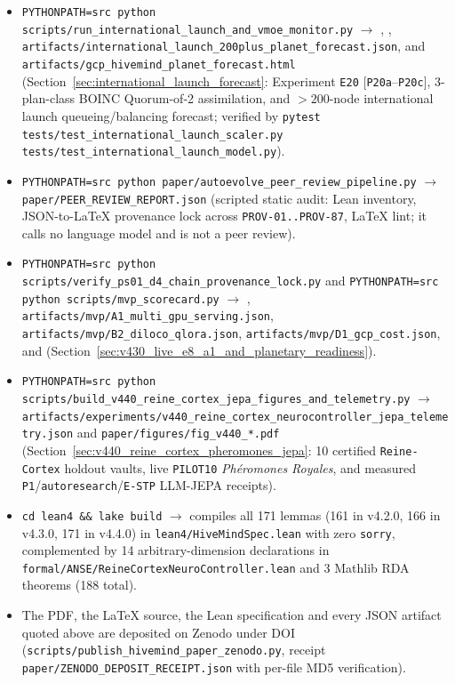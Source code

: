 \documentclass[11pt,a4paper]{article}
\begin{document}
\begin{itemize}[leftmargin=1.8em]
    \item \texttt{PYTHONPATH=src python scripts/run\_international\_launch\_and\_vmoe\_monitor.py} $\to$ , , \texttt{artifacts/international\_launch\_200plus\_planet\_forecast.json}, and \texttt{artifacts/gcp\_hivemind\_planet\_forecast.html} (Section~\ref{sec:international_launch_forecast}: Experiment \texttt{E20} [\texttt{P20a}--\texttt{P20c}], 3-plan-class BOINC Quorum-of-2 assimilation, and $>200$-node international launch queueing/balancing forecast; verified by \texttt{pytest tests/test\_international\_launch\_scaler.py tests/test\_international\_launch\_model.py}).
    \item \texttt{PYTHONPATH=src python paper/autoevolve\_peer\_review\_pipeline.py} $\to$ \texttt{paper/PEER\_REVIEW\_REPORT.json} (scripted static audit: Lean inventory, JSON-to-LaTeX provenance lock across \texttt{PROV-01..PROV-87}, LaTeX lint; it calls no language model and is not a peer review).
    \item \texttt{PYTHONPATH=src python scripts/verify\_ps01\_d4\_chain\_provenance\_lock.py} and \texttt{PYTHONPATH=src python scripts/mvp\_scorecard.py} $\to$ , \texttt{artifacts/mvp/A1\_multi\_gpu\_serving.json}, \texttt{artifacts/mvp/B2\_diloco\_qlora.json}, \texttt{artifacts/mvp/D1\_gcp\_cost.json}, and  (Section~\ref{sec:v430_live_e8_a1_and_planetary_readiness}).
    \item \texttt{PYTHONPATH=src python scripts/\allowbreak build\_v440\_reine\_cortex\_\allowbreak jepa\_figures\_and\_telemetry.py} $\to$ \texttt{artifacts/experiments/\allowbreak v440\_reine\_cortex\_\allowbreak neurocontroller\_jepa\_\allowbreak telemetry.json} and \texttt{paper/figures/fig\_v440\_*.pdf} (Section~\ref{sec:v440_reine_cortex_pheromones_jepa}: 10 certified \texttt{Reine-Cortex} holdout vaults, live \texttt{PILOT10} \emph{Ph\'eromones Royales}, and measured \texttt{P1}/\texttt{autoresearch}/\texttt{E-STP} LLM-JEPA receipts).
    \item \texttt{cd lean4 \&\& lake build} $\to$ compiles all 171 lemmas (161 in v4.2.0, 166 in v4.3.0, 171 in v4.4.0) in \texttt{lean4/HiveMindSpec.lean} with zero \texttt{sorry}, complemented by 14 arbitrary-dimension declarations in \texttt{formal/ANSE/ReineCortexNeuroController.lean} and 3 Mathlib RDA theorems (188 total).
    \item The PDF, the LaTeX source, the Lean specification and every JSON artifact quoted above are deposited on Zenodo under DOI \zenodoDOI{} (\texttt{scripts/publish\_hivemind\_paper\_zenodo.py}, receipt \texttt{paper/ZENODO\_DEPOSIT\_RECEIPT.json} with per-file MD5 verification).
\end{itemize}
\end{document}
